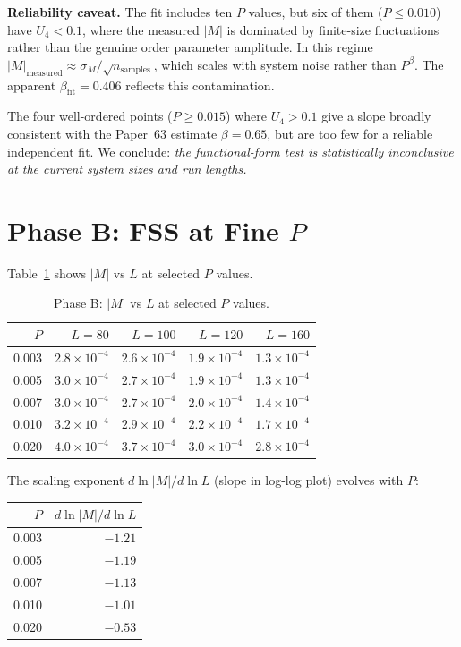 \documentclass[twocolumn,10pt]{article}
\begin{document}
\textbf{Reliability caveat.}
The fit includes ten $P$ values, but six of them ($P \leq 0.010$) have
$U_4 < 0.1$, where the measured $|M|$ is dominated by finite-size fluctuations
rather than the genuine order parameter amplitude.
In this regime $|M|_\mathrm{measured} \approx \sigma_M / \sqrt{n_\mathrm{samples}}$,
which scales with system noise rather than $P^\beta$.
The apparent $\beta_\mathrm{fit} = 0.406$ reflects this contamination.

The four well-ordered points ($P \geq 0.015$) where $U_4 > 0.1$ give
a slope broadly consistent with the Paper~63 estimate $\beta = 0.65$,
but are too few for a reliable independent fit.
We conclude: \emph{the functional-form test is statistically inconclusive
at the current system sizes and run lengths.}

\section{Phase B: FSS at Fine $P$}

Table~\ref{tab:phaseB} shows $|M|$ vs $L$ at selected $P$ values.

\begin{table}[h]
\centering
\caption{Phase B: $|M|$ vs $L$ at selected $P$ values.}
\label{tab:phaseB}
\begin{tabular}{rrrrr}
\toprule
$P$ & $L=80$ & $L=100$ & $L=120$ & $L=160$ \\
\midrule
0.003 & $2.8\times10^{-4}$ & $2.6\times10^{-4}$ & $1.9\times10^{-4}$ & $1.3\times10^{-4}$ \\
0.005 & $3.0\times10^{-4}$ & $2.7\times10^{-4}$ & $1.9\times10^{-4}$ & $1.3\times10^{-4}$ \\
0.007 & $3.0\times10^{-4}$ & $2.7\times10^{-4}$ & $2.0\times10^{-4}$ & $1.4\times10^{-4}$ \\
0.010 & $3.2\times10^{-4}$ & $2.9\times10^{-4}$ & $2.2\times10^{-4}$ & $1.7\times10^{-4}$ \\
0.020 & $4.0\times10^{-4}$ & $3.7\times10^{-4}$ & $3.0\times10^{-4}$ & $2.8\times10^{-4}$ \\
\bottomrule
\end{tabular}
\end{table}

The scaling exponent $d\ln|M|/d\ln L$ (slope in log-log plot) evolves with $P$:

\begin{center}
\begin{tabular}{rr}
\toprule
$P$ & $d\ln|M|/d\ln L$ \\
\midrule
0.003 & $-1.21$ \\
0.005 & $-1.19$ \\
0.007 & $-1.13$ \\
0.010 & $-1.01$ \\
0.020 & $-0.53$ \\
\bottomrule
\end{tabular}
\end{center}
\end{document}
